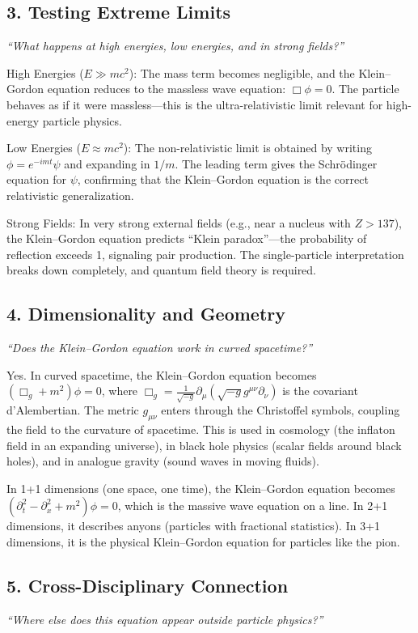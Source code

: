\subsection*{3. Testing Extreme Limits}
\textit{``What happens at high energies, low energies, and in strong fields?''}

High Energies ($E \gg mc^2$): The mass term becomes negligible, and the Klein--Gordon equation reduces to the massless wave equation: $\Box\phi = 0$. The particle behaves as if it were massless---this is the ultra-relativistic limit relevant for high-energy particle physics.

Low Energies ($E \approx mc^2$): The non-relativistic limit is obtained by writing $\phi = e^{-imt}\psi$ and expanding in $1/m$. The leading term gives the Schr\"odinger equation for $\psi$, confirming that the Klein--Gordon equation is the correct relativistic generalization.

Strong Fields: In very strong external fields (e.g., near a nucleus with $Z > 137$), the Klein--Gordon equation predicts ``Klein paradox''---the probability of reflection exceeds 1, signaling pair production. The single-particle interpretation breaks down completely, and quantum field theory is required.

\subsection*{4. Dimensionality and Geometry}
\textit{``Does the Klein--Gordon equation work in curved spacetime?''}

Yes. In curved spacetime, the Klein--Gordon equation becomes $(\Box_g + m^2)\phi = 0$, where $\Box_g = \frac{1}{\sqrt{-g}}\partial_\mu(\sqrt{-g}g^{\mu\nu}\partial_\nu)$ is the covariant d'Alembertian. The metric $g_{\mu\nu}$ enters through the Christoffel symbols, coupling the field to the curvature of spacetime. This is used in cosmology (the inflaton field in an expanding universe), in black hole physics (scalar fields around black holes), and in analogue gravity (sound waves in moving fluids).

In 1+1 dimensions (one space, one time), the Klein--Gordon equation becomes $(\partial_t^2 - \partial_x^2 + m^2)\phi = 0$, which is the massive wave equation on a line. In 2+1 dimensions, it describes anyons (particles with fractional statistics). In 3+1 dimensions, it is the physical Klein--Gordon equation for particles like the pion.

\subsection*{5. Cross-Disciplinary Connection}
\textit{``Where else does this equation appear outside particle physics?''}

